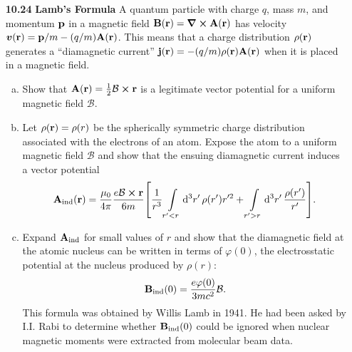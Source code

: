 \documentclass{article}
\begin{document}
\begin{enumerate}[align=parleft,labelsep=20pt]
    \item [\textbf{10.24 }] \textbf{Lamb's Formula } A quantum particle with charge $q$, mass $m$, and momentum $\vb{p}$ in a magnetic field $\vb{B}(\vb{r}) = \curl{\vb{A}(\vb{r})}$ has velocity $\vb*{v}(\vb{r}) = \vb{p}/m - (q/m)\vb{A}(\vb{r})$. This means that a charge distribution $\rho(\vb{r})$ generates a ``diamagnetic current'' $\vb{j}(\vb{r}) = -(q/m)\rho(\vb{r})\vb{A}(\vb{r})$ when it is placed in a magnetic field.
    \begin{enumerate}[(a), align=parleft,labelsep=20pt]
        \item Show that $\vb{A}(\vb{r}) = \frac{1}{2}\mathcal{B}\cp\vb{r}$ is a legitimate vector potential for a uniform magnetic field $\mathcal{B}$.

        \item Let $\rho(\vb{r}) = \rho(r)$ be the spherically symmetric charge distribution associated with the electrons of an atom. Expose the atom to a uniform magnetic field $\mathcal{B}$ and show that the ensuing diamagnetic current induces a vector potential
        \[
            \vb{A_\text{ind}}(\vb{r}) = \frac{\mu_0}{4\pi}\frac{e\mathcal{B}\cp\vb{r}}{6m}\bqty{\frac{1}{r^3}\int\limits_{r'<r}\dd[3]{r'}\rho(r')r'^2 + \int\limits_{r'>r}\dd[3]{r'}\frac{\rho(r')}{r'}}.
        \]

        \item Expand $\vb{A_\text{ind}}$ for small values of $r$ and show that the diamagnetic field at the atomic nucleus can be written in terms of $\varphi(0)$, the electrosstatic potential at the nucleus produced by $\rho(r)$:
        \[
            \vb{B_\text{ind}}(0) = \frac{e\varphi(0)}{3mc^2}\mathcal{B}.
        \]
        This formula was obtained by Willis Lamb in 1941. He had been asked by I.I. Rabi to determine whether $\vb{B_\text{ind}}(0)$ could be ignored when nuclear magnetic moments were extracted from molecular beam data.
    \end{enumerate}
\end{enumerate}
\end{document}
